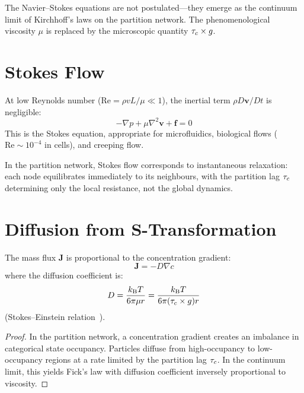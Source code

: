 \begin{remark}
The Navier--Stokes equations are not postulated---they emerge as the continuum limit of Kirchhoff's laws on the partition network. The phenomenological viscosity $\mu$ is replaced by the microscopic quantity $\tau_c \times g$.
\end{remark}

\section{Stokes Flow}
\label{sec:stokes}

At low Reynolds number ($\mathrm{Re} = \rho v L/\mu \ll 1$), the inertial term $\rho D\mathbf{v}/Dt$ is negligible:
\begin{equation}
    -\nabla p + \mu \nabla^2 \mathbf{v} + \mathbf{f} = 0
\end{equation}
This is the Stokes equation, appropriate for microfluidics, biological flows ($\mathrm{Re} \sim 10^{-4}$ in cells), and creeping flow.

In the partition network, Stokes flow corresponds to instantaneous relaxation: each node equilibrates immediately to its neighbours, with the partition lag $\tau_c$ determining only the local resistance, not the global dynamics.

\section{Diffusion from S-Transformation}
\label{sec:diffusion}

\begin{theorem}
\label{thm:fick}
The mass flux $\mathbf{J}$ is proportional to the concentration gradient:
\begin{equation}
    \mathbf{J} = -D\nabla c
\end{equation}
where the diffusion coefficient is:
\begin{equation}
    D = \frac{k_{\mathrm{B}} T}{6\pi \mu r} = \frac{k_{\mathrm{B}} T}{6\pi (\tau_c \times g) r}
\end{equation}
(Stokes--Einstein relation~\cite{einstein1905}).
\end{theorem}

\begin{proof}
In the partition network, a concentration gradient creates an imbalance in categorical state occupancy. Particles diffuse from high-occupancy to low-occupancy regions at a rate limited by the partition lag $\tau_c$. In the continuum limit, this yields Fick's law with diffusion coefficient inversely proportional to viscosity.
\end{proof}

